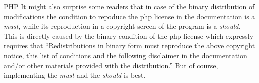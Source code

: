 \begin{license}{PHP}
It might also surprise some readers that in case of the binary distribution of
modifications the condition to repoduce the php license in the documentation is
a \emph{must,} while its reproduction in a copyright screen of the program is a
\emph{should.} This is directly caused by the binary-condition of the php license
which expressly requires that \enquote{Redistributions in binary form must
reproduce the above copyright notice, this list of conditions and the following
disclaimer in the documentation and/or other materials provided with the
distribution.}\citePHP{} But of course, implementing the \emph{must} and the
\emph{should} is best. 

\end{license}

%

